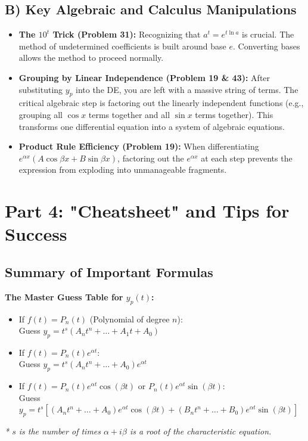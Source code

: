 \documentclass[12pt]{article}
\begin{document}
\subsection{B) Key Algebraic and Calculus Manipulations}
\begin{itemize}
    \item \textbf{The $10^t$ Trick (Problem 31):} Recognizing that $a^t = e^{t \ln a}$ is crucial. The method of undetermined coefficients is built around base $e$. Converting bases allows the method to proceed normally.
    \item \textbf{Grouping by Linear Independence (Problem 19 \& 43):} After substituting $y_p$ into the DE, you are left with a massive string of terms. The critical algebraic step is factoring out the linearly independent functions (e.g., grouping all $\cos x$ terms together and all $\sin x$ terms together). This transforms one differential equation into a system of algebraic equations.
    \item \textbf{Product Rule Efficiency (Problem 19):} When differentiating $e^{\alpha x}(A \cos \beta x + B \sin \beta x)$, factoring out the $e^{\alpha x}$ at each step prevents the expression from exploding into unmanageable fragments.
\end{itemize}

\newpage
\section{Part 4: "Cheatsheet" and Tips for Success}

\subsection{Summary of Important Formulas}
\begin{tcolorbox}
\textbf{The Master Guess Table for $y_p(t)$:}
\begin{itemize}
    \item If $f(t) = P_n(t)$ (Polynomial of degree $n$): \\ Guess $y_p = t^s (A_n t^n + \dots + A_1 t + A_0)$
    \item If $f(t) = P_n(t) e^{\alpha t}$: \\ Guess $y_p = t^s (A_n t^n + \dots + A_0) e^{\alpha t}$
    \item If $f(t) = P_n(t) e^{\alpha t} \cos(\beta t)$ or $P_n(t) e^{\alpha t} \sin(\beta t)$: \\ Guess $y_p = t^s \left[ (A_n t^n + \dots + A_0) e^{\alpha t} \cos(\beta t) + (B_n t^n + \dots + B_0) e^{\alpha t} \sin(\beta t) \right]$
\end{itemize}
\textit{* $s$ is the number of times $\alpha + i\beta$ is a root of the characteristic equation.}
\end{tcolorbox}
\end{document}

